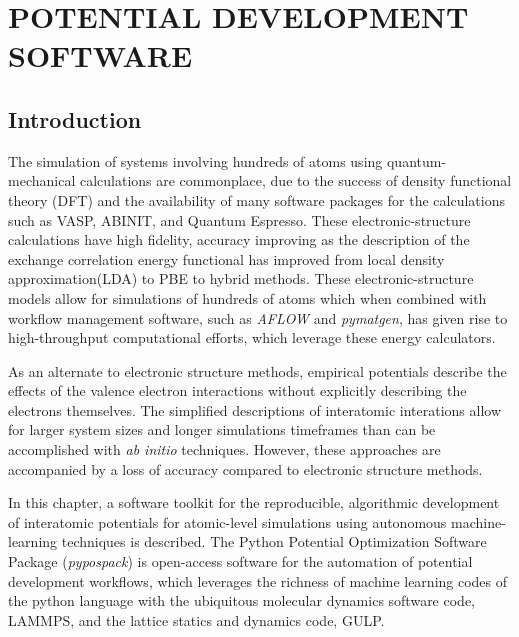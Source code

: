 \chapter{POTENTIAL DEVELOPMENT SOFTWARE}
\label{ch:software}
\lstset{
	language=python,
	numbers=left,
	numberstyle=\tiny,
	columns=fullflexible,
	showstringspaces=false
}
\section{Introduction}

The simulation of systems involving hundreds of atoms using quantum-mechanical calculations are commonplace, due to the success of density functional theory (DFT)\cite{hohenberg1964_dft,kohn1965_dft} and the availability of many software packages for the calculations such as VASP\cite{kresse1993_vasp,kresse1996_vasp1,kresse1996_vasp2}, ABINIT\cite{gonze2002_abinit,gonze2005_abinit,gonze2009_abinit,gonze2016_abinit}, and Quantum Espresso\cite{giannozzi2009_quantumespresso}.
These electronic-structure calculations have high fidelity, accuracy improving as the description of the exchange correlation energy functional has improved from local density approximation(LDA) to PBE to hybrid methods.
These electronic-structure models allow for simulations of hundreds of atoms which when combined with workflow management software, such as \emph{AFLOW}\cite{curtarolo2012_aflow} and \emph{pymatgen}\cite{ong2013_pymatgen}, has given rise to high-throughput computational efforts, which leverage these energy calculators.

As an alternate to electronic structure methods, empirical potentials describe the effects of the valence electron interactions without explicitly describing the electrons themselves.  The simplified descriptions of interatomic interations allow for larger system sizes and longer simulations timeframes than can be accomplished with \emph{ab initio} techniques.  However, these approaches are accompanied by a loss of accuracy compared to electronic structure methods.

In this chapter, a software toolkit for the reproducible, algorithmic development of interatomic potentials for atomic-level simulations using autonomous machine-learning techniques is described.
The Python Potential Optimization Software Package {(\emph{pypospack})} is open-access software for the automation of potential development workflows, which leverages the richness of machine learning codes of the python language with the ubiquitous molecular dynamics software code, LAMMPS\cite{plimpton1995_lammps}, and the lattice statics and dynamics code, GULP\cite{gale2003_gulp}.

